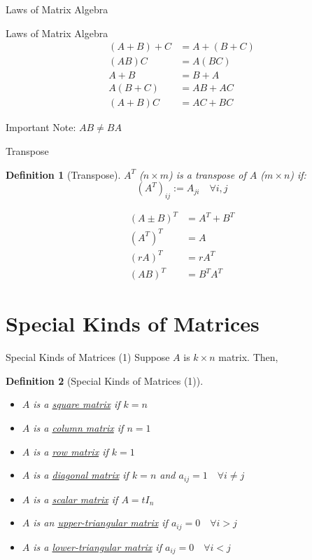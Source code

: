\documentclass[a4paper,11pt]{article}
\newtheorem{defn}{Definition}
\begin{document}
\begin{frame}[t]{Laws of Matrix Algebra}
	\begin{block}
		{Laws of Matrix Algebra}
		\begin{align*}
				(A+B)+C &= A+(B+C) \tag{Associative Law for Addition}\\
				(AB)C&=A(BC)\tag{Associative Law for Multiplication}\\
				A+B &= B+A \tag{Commutative Law for Addition}\\
				A(B+C)&=AB+AC \tag{Distributive Law}\\
				(A+B)C&=AC+BC \tag{Distributive Law}
		\end{align*}
	\end{block}
	Important Note: $AB\neq BA$
\end{frame}

\begin{frame}[t]{Transpose}
	\begin{defn}
		[Transpose]
		$A^T$ ($n\times m$) is a transpose of $A$ ($m\times n$) if: \[
			(A^T)_{ij} := A_{ji}\quad \forall i,j
		\]
	\end{defn}
	\begin{align*}
		(A\pm B)^T &= A^T + B^T\\
		(A^T)^T &= A\\
		(rA)^T &= r A^T\\
		(AB)^T &= B^T A^T \tag{Theorem 8.1}
	\end{align*}
\end{frame}

\section{Special Kinds of Matrices} %
\label{sec:special_kinds_of_matrices}
\begin{frame}[t]{Special Kinds of Matrices (1)}
	Suppose $A$ is $k\times n$ matrix. Then,
	\begin{defn}
		[Special Kinds of Matrices (1)]
		\begin{itemize}
			\item $A$ is a \uline{square matrix} if $k=n$
			\item $A$ is a \uline{column matrix} if $n=1$
			\item $A$ is a \uline{row matrix} if $k=1$
			\item $A$ is a \uline{diagonal matrix} if $k=n$ and $a_{ij}=1\quad \forall i\neq j$
			\item $A$ is a \uline{scalar matrix} if $A=tI_n$
			\item $A$ is an \uline{upper-triangular matrix} if $a_{ij}=0\quad\forall i>j$
			\item $A$ is a \uline{lower-triangular matrix} if $a_{ij}=0\quad\forall i<j$
		\end{itemize}
	\end{defn}
\end{frame}
\end{document}
